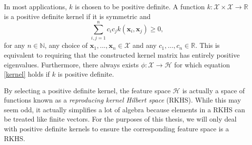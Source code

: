 In most applications, $k$ is chosen to be positive definite. A function $k: \mathcal{X} \times \mathcal{X} \rightarrow \mathbb{R}$ is a positive definite kernel if it is symmetric and
\begin{equation}
\sum_{i, j=1}^{n} c_{i} c_{j} k\left(\mathbf{x}_{i}, \mathbf{x}_{j}\right) \geq 0,
\end{equation}
for any $n \in \mathbb{N}$, any choice of $\mathbf{x}_1,...,\mathbf{x}_n \in \mathcal{X}$ and any $c_1,...,c_n \in \mathbb{R}$. This is equivalent to requiring that the constructed kernel matrix has entirely positive eigenvalues. Furthermore, there always exists $\phi: \mathcal{X} \rightarrow \mathcal{H}$ for which equation \ref{kernel} holds  if $k$ is positive definite.

By selecting a positive definite kernel, the feature space $\mathcal{H}$ is actually a space of functions known as a \textit{reproducing kernel Hilbert space} (RKHS). While this may seem odd, it actually simplifies a lot of algebra because elements in a RKHS can be treated like finite vectors.  For the purposes of this  thesis, we will only deal with positive definite kernels to ensure the corresponding feature space is a RKHS.




